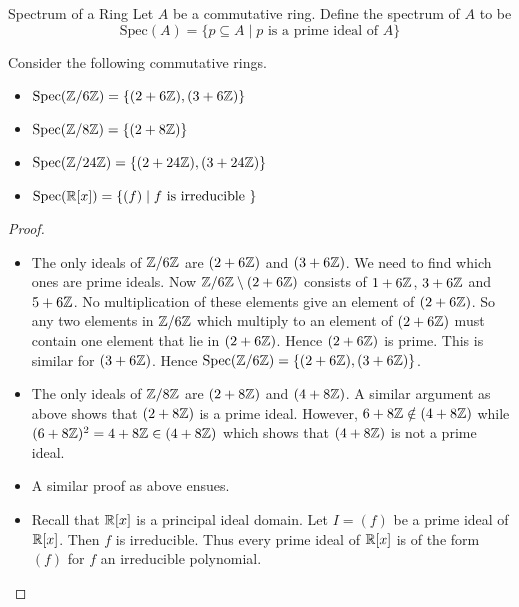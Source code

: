 \documentclass[a4paper]{article}
\begin{document}
\begin{defn}{Spectrum of a Ring}{} Let $A$ be a commutative ring. Define the spectrum of $A$ to be $$\text{Spec}(A)=\{p\subseteq A\;|\;p\text{ is a prime ideal of }A\}$$
\end{defn}

\begin{eg}{}{} Consider the following commutative rings. 
\begin{itemize}
\item $\text{Spec}(\mathbb{Z}/6\mathbb{Z})=\{(2+6\mathbb{Z}),(3+6\mathbb{Z})\}$
\item $\text{Spec}(\mathbb{Z}/8\mathbb{Z})=\{(2+8\mathbb{Z})\}$
\item $\text{Spec}(\mathbb{Z}/24\mathbb{Z})=\{(2+24\mathbb{Z}),(3+24\mathbb{Z})\}$
\item $\text{Spec}(\mathbb{R}[x])=\{(f)\;|\;f\text{ is irreducible }\}$
\end{itemize} \tcbline
\begin{proof}~\\
\begin{itemize}
\item The only ideals of $\mathbb{Z}/6\mathbb{Z}$ are $(2+6\mathbb{Z})$ and $(3+6\mathbb{Z})$. We need to find which ones are prime ideals. Now $\mathbb{Z}/6\mathbb{Z}\setminus(2+6\mathbb{Z})$ consists of $1+6\mathbb{Z}$, $3+6\mathbb{Z}$ and $5+6\mathbb{Z}$. No multiplication of these elements give an element of $(2+6\mathbb{Z})$. So any two elements in $\mathbb{Z}/6\mathbb{Z}$ which multiply to an element of $(2+6\mathbb{Z})$ must contain one element that lie in $(2+6\mathbb{Z})$. Hence $(2+6\mathbb{Z})$ is prime. This is similar for $(3+6\mathbb{Z})$. Hence $\text{Spec}(\mathbb{Z}/6\mathbb{Z})=\{(2+6\mathbb{Z}),(3+6\mathbb{Z})\}$. 
\item The only ideals of $\mathbb{Z}/8\mathbb{Z}$ are $(2+8\mathbb{Z})$ and $(4+8\mathbb{Z})$. A similar argument as above shows that $(2+8\mathbb{Z})$ is a prime ideal. However, $6+8\mathbb{Z}\notin(4+8\mathbb{Z})$ while $(6+8\mathbb{Z})^2=4+8\mathbb{Z}\in(4+8\mathbb{Z})$ which shows that $(4+8\mathbb{Z})$ is not a prime ideal. 
\item A similar proof as above ensues. 
\item Recall that $\mathbb{R}[x]$ is a principal ideal domain. Let $I=(f)$ be a prime ideal of $\mathbb{R}[x]$. Then $f$ is irreducible. Thus every prime ideal of $\mathbb{R}[x]$ is of the form $(f)$ for $f$ an irreducible polynomial. 
\end{itemize}
\end{proof}
\end{eg}
\end{document}
